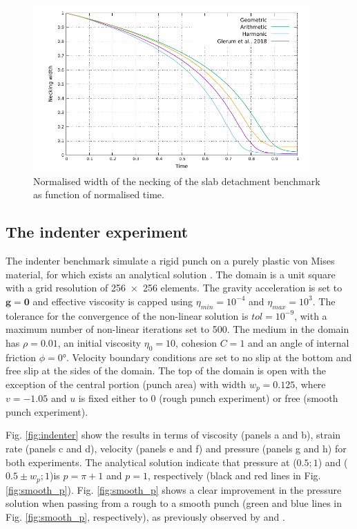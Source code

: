 \documentclass[hidelinks,11pt,a4paper]{article}
\begin{document}
\begin{figure}
\centering
\noindent\includegraphics[width=400px]{./Figures/Necking.pdf}
\caption{Normalised width of the necking of the slab detachment benchmark as function of normalised time.}
\label{fig:necking}
\end{figure}

\subsection{The indenter experiment}\label{sec:indenter}
The indenter benchmark simulate a rigid punch on a purely plastic von Mises material, for which exists an analytical solution \citep{Thieulot2008,Thieulot2014,Glerum2018}. The domain is a unit square with a grid resolution of \num{256x256} elements. The gravity acceleration is set to $\bm{g}=\bm{0}$ and effective viscosity is capped using $\eta_{min}=10^{-4}$ and $\eta_{max}=10^3$. The tolerance for the convergence of the non-linear solution is $tol=10^{-9}$, with a maximum number of non-linear iterations set to 500. The medium in the domain has $\rho=0.01$, an initial viscosity $\eta_0=10$, cohesion $C=1$ and an angle of internal friction $\phi=0$°. Velocity boundary conditions are set to no slip at the bottom and free slip at the sides of the domain. The top of the domain is open with the exception of the central portion (punch area) with width $w_p=0.125$, where $v=-1.05$ and $u$ is fixed either to 0 (rough punch experiment) or free (smooth punch experiment).

Fig. \ref{fig:indenter} show the results in terms of viscosity (panels a and b), strain rate (panels c and d), velocity (panels e and f) and pressure (panels g and h) for both experiments. The analytical solution indicate that pressure at ($0.5;1$) and ($0.5 \pm w_p;1$)is $p=\pi +1$ and $p=1$, respectively (black and red lines in Fig. \ref{fig:smooth_p}). Fig. \ref{fig:smooth_p} shows a clear improvement in the pressure solution when passing from a rough to a smooth punch (green and blue lines in Fig. \ref{fig:smooth_p}, respectively), as previously observed by \citet{Thieulot2014} and \citet{Glerum2018}.
\end{document}
